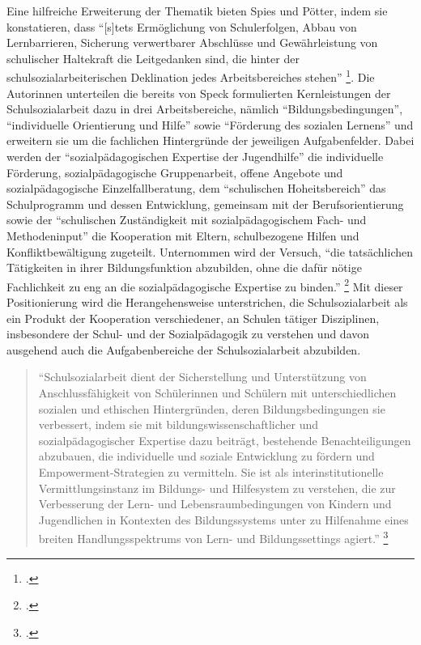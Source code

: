 Eine hilfreiche Erweiterung der Thematik bieten Spies und Pötter, indem sie konstatieren, dass "`[s]tets Ermöglichung von Schulerfolgen, Abbau von Lernbarrieren, Sicherung verwertbarer Abschlüsse und Gewährleistung von schulischer Haltekraft die Leitgedanken sind, die hinter der schulsozialarbeiterischen Deklination jedes Arbeitsbereiches stehen"' \footcite[93]{Spies2011}. Die Autorinnen unterteilen die bereits von Speck formulierten Kernleistungen der Schulsozialarbeit dazu in drei Arbeitsbereiche, nämlich "`Bildungsbedingungen"', "`individuelle Orientierung und Hilfe"' sowie "`Förderung des sozialen Lernens"' und erweitern sie um die fachlichen Hintergründe der jeweiligen Aufgabenfelder. Dabei werden der "`sozialpädagogischen Expertise der Jugendhilfe"' die individuelle Förderung, sozialpädagogische Gruppenarbeit, offene Angebote und sozialpädagogische Einzelfallberatung, dem "`schulischen Hoheitsbereich"' das  Schulprogramm und dessen Entwicklung, gemeinsam mit der Berufsorientierung sowie der "`schulischen Zuständigkeit mit sozialpädagogischem Fach- und Methodeninput"' die Kooperation mit Eltern, schulbezogene Hilfen und Konfliktbewältigung zugeteilt. Unternommen wird der Versuch, "`die tatsächlichen Tätigkeiten in ihrer Bildungsfunktion abzubilden, ohne die dafür nötige Fachlichkeit zu eng an die sozialpädagogische Expertise zu binden."' \footcite[91]{Spies2011} Mit dieser Positionierung wird die Herangehensweise unterstrichen, die Schulsozialarbeit als ein Produkt der Kooperation verschiedener, an Schulen tätiger Disziplinen, insbesondere der Schul- und der Sozialpädagogik zu verstehen und davon ausgehend auch die Aufgabenbereiche der Schulsozialarbeit abzubilden.

\begin{quotation}
\noindent
"`Schulsozialarbeit dient der Sicherstellung und Unterstützung von Anschlussfähigkeit von Schülerinnen und Schülern mit unterschiedlichen sozialen und ethischen Hintergründen, deren Bildungsbedingungen sie verbessert, indem sie mit bildungswissenschaftlicher und sozialpädagogischer Expertise dazu beiträgt, bestehende Benachteiligungen abzubauen, die individuelle und soziale Entwicklung zu fördern und Empowerment-Strategien zu vermitteln. Sie ist als interinstitutionelle Vermittlungsinstanz im Bildungs- und Hilfesystem zu verstehen, die zur Verbesserung der Lern- und Lebensraumbedingungen von Kindern und Jugendlichen in Kontexten des Bildungssystems unter zu Hilfenahme eines breiten Handlungsspektrums von Lern- und Bildungssettings agiert."' \footcite[92]{Spies2011}
\end{quotation}

